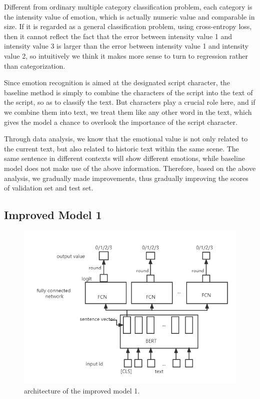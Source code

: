 \documentclass[12pt,twocolumn,letterpaper]{article}
\begin{document}
Different from ordinary multiple category classification problem, each category is the intensity value of emotion, which is actually numeric value and comparable in size. If it is regarded as a general classification problem, using cross-entropy loss, then it cannot reflect the fact that the error between intensity value 1 and intensity value 3 is larger than the error between intensity value 1 and intensity value 2, so intuitively we think it makes more sense to turn to regression rather than categorization.  

Since emotion recognition is aimed at the designated script character, the baseline method is simply to combine the characters of the script into the text of the script, so as to classify the text. But characters play a crucial role here, and if we combine them into text, we treat them like any other word in the text, which gives the model a chance to overlook the importance of the script character.  

Through data analysis, we know that the emotional value is not only related to the current text, but also related to historic text within the same scene. The same sentence in different contexts will show different emotions, while baseline model does not make use of the above information.  
Therefore, based on the above analysis, we gradually made improvements, thus gradually improving the scores of validation set and test set.    


\subsection{Improved Model 1}
\begin{figure}
\begin{center}
\includegraphics[scale=0.5]{Method2.png}
\end{center}
   \caption{architecture of the improved model 1.}
\label{fig:short}
\end{figure}
\end{document}
